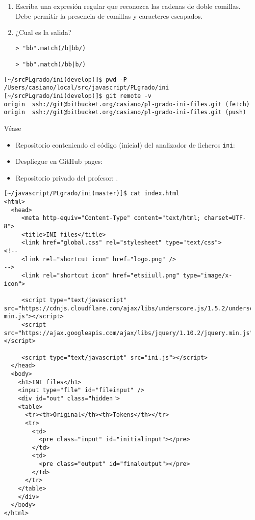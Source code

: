 \begin{enumerate}
\item 
Escriba una expresión regular que reconozca las cadenas de doble comillas.
Debe permitir la presencia de comillas y caracteres escapados.
\item 
¿Cual es la salida?
\begin{verbatim}
> "bb".match(/b|bb/)

> "bb".match(/bb|b/)

\end{verbatim}

\end{enumerate}


\begin{verbatim}
[~/srcPLgrado/ini(develop)]$ pwd -P
/Users/casiano/local/src/javascript/PLgrado/ini
[~/srcPLgrado/ini(develop)]$ git remote -v
origin  ssh://git@bitbucket.org/casiano/pl-grado-ini-files.git (fetch)
origin  ssh://git@bitbucket.org/casiano/pl-grado-ini-files.git (push)
\end{verbatim}

Véase
\begin{itemize}
\item Repositorio conteniendo el código (inicial) del analizador de ficheros \verb|ini|:
\item Despliegue en GitHub pages:
\item Repositorio privado del profesor: 
.
\end{itemize}
\begin{verbatim}
[~/javascript/PLgrado/ini(master)]$ cat index.html 
<html>
  <head>
     <meta http-equiv="Content-Type" content="text/html; charset=UTF-8">
     <title>INI files</title>
     <link href="global.css" rel="stylesheet" type="text/css">
<!--
     <link rel="shortcut icon" href="logo.png" />
-->
     <link rel="shortcut icon" href="etsiiull.png" type="image/x-icon">

     <script type="text/javascript" src="https://cdnjs.cloudflare.com/ajax/libs/underscore.js/1.5.2/underscore-min.js"></script>
     <script src="https://ajax.googleapis.com/ajax/libs/jquery/1.10.2/jquery.min.js"></script>

     <script type="text/javascript" src="ini.js"></script>
  </head>
  <body>
    <h1>INI files</h1>
    <input type="file" id="fileinput" />
    <div id="out" class="hidden">
    <table>
      <tr><th>Original</th><th>Tokens</th></tr>
      <tr>
        <td>
          <pre class="input" id="initialinput"></pre>
        </td>
        <td>
          <pre class="output" id="finaloutput"></pre>
        </td>
      </tr>
    </table>
    </div>
  </body>
</html>
\end{verbatim}

